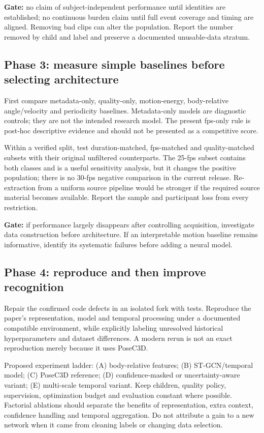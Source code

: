 \textbf{Gate:} no claim of subject-independent performance until identities are established; no continuous burden claim until full event coverage and timing are aligned. Removing bad clips can alter the population. Report the number removed by child and label and preserve a documented unusable-data stratum.

\subsection{Phase 3: measure simple baselines before selecting architecture}
First compare metadata-only, quality-only, motion-energy, body-relative angle/velocity and periodicity baselines. Metadata-only models are diagnostic controls; they are not the intended research model. The present fps-only rule is post-hoc descriptive evidence and should not be presented as a competitive score.

Within a verified split, test duration-matched, fps-matched and quality-matched subsets with their original unfiltered counterparts. The 25-fps subset contains both classes and is a useful sensitivity analysis, but it changes the positive population; there is no 30-fps negative comparison in the current release. Re-extraction from a uniform source pipeline would be stronger if the required source material becomes available. Report the sample and participant loss from every restriction.

\textbf{Gate:} if performance largely disappears after controlling acquisition, investigate data construction before architecture. If an interpretable motion baseline remains informative, identify its systematic failures before adding a neural model.

\subsection{Phase 4: reproduce and then improve recognition}
Repair the confirmed code defects in an isolated fork with tests. Reproduce the paper's representation, model and temporal processing under a documented compatible environment, while explicitly labeling unresolved historical hyperparameters and dataset differences. A modern rerun is not an exact reproduction merely because it uses PoseC3D.

Proposed experiment ladder: (A) body-relative features; (B) ST-GCN/temporal model; (C) PoseC3D reference; (D) confidence-masked or uncertainty-aware variant; (E) multi-scale temporal variant. Keep children, quality policy, supervision, optimization budget and evaluation constant where possible. Factorial ablations should separate the benefits of representation, extra context, confidence handling and temporal aggregation. Do not attribute a gain to a new network when it came from cleaning labels or changing data selection.

